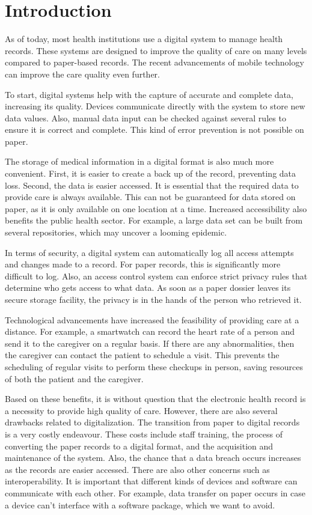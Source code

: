 \section{Introduction}

As of today, most health institutions use a digital system to manage health records. These systems are designed to improve the quality of care on many levels compared to paper-based records. The recent advancements of mobile technology can improve the care quality even further.

To start, digital systems help with the capture of accurate and complete data, increasing its quality. Devices communicate directly with the system to store new data values. Also, manual data input can be checked against several rules to ensure it is correct and complete. This kind of error prevention is not possible on paper.

The storage of medical information in a digital format is also much more convenient. First, it is easier to create a back up of the record, preventing data loss. Second, the data is easier accessed. It is essential that the required data to provide care is always available. This can not be guaranteed for data stored on paper, as it is only available on one location at a time. Increased accessibility also benefits the public health sector. For example, a large data set can be built from several repositories, which may uncover a looming epidemic.

In terms of security, a digital system can automatically log all access attempts and changes made to a record. For paper records, this is significantly more difficult to log. Also, an access control system can enforce strict privacy rules that determine who gets access to what data. As soon as a paper dossier leaves its secure storage facility, the privacy is in the hands of the person who retrieved it.

Technological advancements have increased the feasibility of providing care at a distance. For example, a smartwatch can record the heart rate of a person and send it to the caregiver on a regular basis. If there are any abnormalities, then the caregiver can contact the patient to schedule a visit. This prevents the scheduling of regular visits to perform these checkups in person, saving resources of both the patient and the caregiver.

Based on these benefits, it is without question that the electronic health record is a necessity to provide high quality of care. However, there are also several drawbacks related to digitalization. The transition from paper to digital records is a very costly endeavour. These costs include staff training, the process of converting the paper records to a digital format, and the acquisition and maintenance of the system. Also, the chance that a data breach occurs increases as the records are easier accessed. There are also other concerns such as interoperability. It is important that different kinds of devices and software can communicate with each other. For example, data transfer on paper occurs in case a device can't interface with a software package, which we want to avoid.

